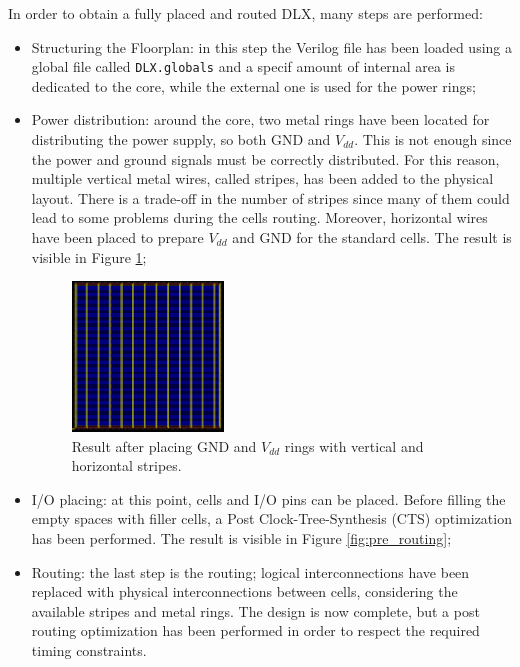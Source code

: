 In order to obtain a fully placed and routed DLX, many steps are performed:
\begin{itemize}
    \item Structuring the Floorplan: in this step the Verilog file has been loaded using a global file called \texttt{DLX.globals} and a specif amount of internal area is dedicated to the core, while the external one is used for the power rings;
    \item Power distribution: around the core, two metal rings have been located for distributing the power supply, so both GND and $V_{dd}$. This is not enough since the power and ground signals must be correctly distributed. For this reason, multiple vertical metal wires, called stripes, has been added to the physical layout. There is a trade-off in the number of stripes since many of them could lead to some problems during the cells routing. Moreover, horizontal wires have been placed to prepare $V_{dd}$ and GND for the standard cells. The result is visible in Figure \ref{stripes};
    \begin{figure}[h]   
        \centering
        \includegraphics[width=0.38\textwidth]{chapters/9_PhysicalDesign/images/pwr_distribution.png}
        \caption{Result after placing GND and $V_{dd}$ rings with vertical and horizontal stripes.}
        \label{stripes}
    \end{figure}
    
    \item I/O placing: at this point, cells and I/O pins can be placed. Before filling the empty spaces with filler cells, a Post Clock-Tree-Synthesis (CTS) optimization has been performed. The result is visible in Figure \ref{fig:pre_routing};
    \item Routing: the last step is the routing; logical interconnections have been replaced with physical interconnections between cells, considering the available stripes and metal rings. The design is now complete, but a post routing optimization has been performed in order to respect the required timing constraints.
\end{itemize}

